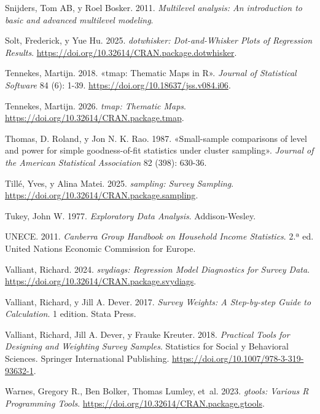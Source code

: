 \documentclass[
  spanish,
  11pt,
  letterpaper,
  oneside,
  open=any]{scrbook}
\newlength{\cslhangindent}
\newenvironment{CSLReferences}[2] %
 {\begin{list}{}{%
  \setlength{\itemindent}{0pt}
  \setlength{\leftmargin}{0pt}
  \setlength{\parsep}{0pt}
  \ifodd #1
   \setlength{\leftmargin}{\cslhangindent}
   \setlength{\itemindent}{-1\cslhangindent}
  \fi
  \setlength{\itemsep}{#2\baselineskip}}}
 {\end{list}}
\begin{document}
\begin{CSLReferences}{1}{1}
Snijders, Tom AB, y Roel Bosker. 2011. \emph{Multilevel analysis: An
introduction to basic and advanced multilevel modeling}.

Solt, Frederick, y Yue Hu. 2025. \emph{dotwhisker: Dot-and-Whisker Plots
of Regression Results}.
\url{https://doi.org/10.32614/CRAN.package.dotwhisker}.

Tennekes, Martijn. 2018. {«tmap: Thematic Maps in R»}. \emph{Journal of
Statistical Software} 84 (6): 1-39.
\url{https://doi.org/10.18637/jss.v084.i06}.

Tennekes, Martijn. 2026. \emph{tmap: Thematic Maps}.
\url{https://doi.org/10.32614/CRAN.package.tmap}.

Thomas, D. Roland, y Jon N. K. Rao. 1987. {«Small-sample comparisons of
level and power for simple goodness-of-fit statistics under cluster
sampling»}. \emph{Journal of the American Statistical Association} 82
(398): 630-36.

Tillé, Yves, y Alina Matei. 2025. \emph{sampling: Survey Sampling}.
\url{https://doi.org/10.32614/CRAN.package.sampling}.

Tukey, John W. 1977. \emph{Exploratory Data Analysis}. Addison-Wesley.

UNECE. 2011. \emph{Canberra Group Handbook on Household Income
Statistics}. 2.ª ed. {United Nations Economic Commission for Europe}.

Valliant, Richard. 2024. \emph{svydiags: Regression Model Diagnostics
for Survey Data}. \url{https://doi.org/10.32614/CRAN.package.svydiags}.

Valliant, Richard, y Jill A. Dever. 2017. \emph{Survey Weights: A
Step-by-step Guide to Calculation}. 1 edition. Stata Press.

Valliant, Richard, Jill A. Dever, y Frauke Kreuter. 2018.
\emph{Practical Tools for Designing and Weighting Survey Samples}.
Statistics for Social y Behavioral Sciences. Springer International
Publishing. \url{https://doi.org/10.1007/978-3-319-93632-1}.

Warnes, Gregory R., Ben Bolker, Thomas Lumley, et~al. 2023.
\emph{gtools: Various R Programming Tools}.
\url{https://doi.org/10.32614/CRAN.package.gtools}.


\end{CSLReferences}
\end{document}
